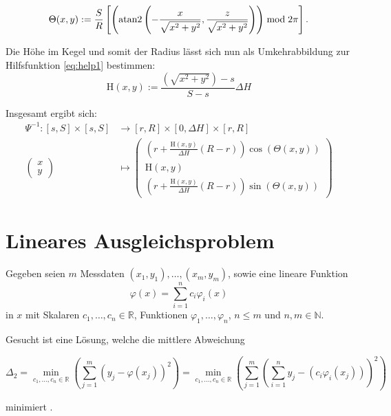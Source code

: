 \begin{equation}\label{eq:help3}
\Theta(x,y) := \frac{S}{R} \left[\left(\text{atan2}\left(-\frac{x}{\sqrt{x^2+y^2}}, \frac{z}{\sqrt{x^2+y^2}}\right)\right) \bmod 2\pi \right].
\end{equation}

Die Höhe  im Kegel und somit der Radius lässt sich nun als Umkehrabbildung zur Hilfsfunktion \ref{eq:help1} bestimmen:
\begin{equation}\label{eq:help4}
\mathrm{H}(x,y) := \frac{\left(\sqrt{x^2+y^2}\right) - s}{S - s}\Delta H
\end{equation}

Insgesamt ergibt sich:
\begin{equation}\label{eq:LateralToCone}
\begin{aligned}
\Psi^{-1} \colon  [s,S]\times[s,S] &\to [r,R] \times [0, \Delta H] \times [r,R]\\
\begin{pmatrix}
x \\ y
\end{pmatrix} &\mapsto
\begin{pmatrix}
\left( r + \frac{\mathrm{H}(x,y)}{\Delta H} (R - r)\right)\cos\left(\Theta(x,y) \right) \\
\mathrm{H}(x,y)\\
\left( r + \frac{\mathrm{H}(x,y)}{\Delta H} (R - r)\right)\sin\left(\Theta(x,y) \right)
\end{pmatrix}
\end{aligned}
\end{equation}


\section{Lineares Ausgleichsproblem}
\label{s:LSQ}
Gegeben seien $m$ Messdaten $(x_1,y_1),\dotsc,(x_m,y_m)$, sowie eine lineare Funktion
\[
\varphi(x) = \sum_{i = 1}^{n}c_i\varphi_i(x)
\] %
in $x$ mit Skalaren $c_1,\dotsc,c_n\in\mathbb{R}$, Funktionen $\varphi_1,\dotsc,\varphi_n$, $n\leq m$ und $n,m\in\mathbb{N}$.

Gesucht ist eine Lösung, welche die mittlere Abweichung

\[
\Delta_2 = \min_{c_1,\dotsc,c_n\in\mathbb{R}} \left(\sum_{j=1}^{m}\left(y_j - \varphi(x_j)\right)^2\right) = \min_{c_1,\dotsc,c_n\in\mathbb{R}} \left(\sum_{j=1}^{m}\left(\sum_{i=1}^{n}y_j-\left(c_i\varphi_i(x_j)\right)\right)^2\right)
\]

minimiert \cite{Stoer2007}.

